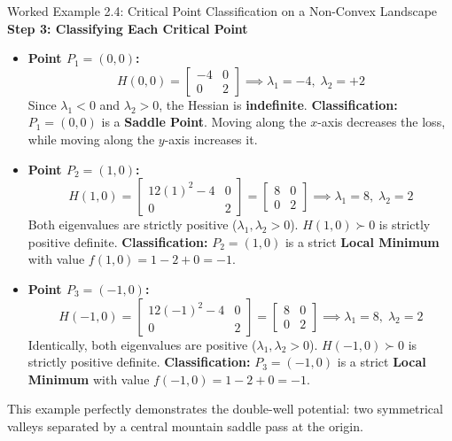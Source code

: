 \begin{examplebox}[breakable]{Worked Example 2.4: Critical Point Classification on a Non-Convex Landscape}
\textbf{Step 3: Classifying Each Critical Point}
\begin{itemize}
    \item \textbf{Point $P_1 = (0, 0)$:}
    \begin{equation*}
    H(0, 0) = \begin{bmatrix} -4 & 0 \\ 0 & 2 \end{bmatrix} \implies \lambda_1 = -4, \; \lambda_2 = +2
    \end{equation*}
    Since $\lambda_1 < 0$ and $\lambda_2 > 0$, the Hessian is \textbf{indefinite}.
    \textbf{Classification:} $P_1 = (0, 0)$ is a \textbf{Saddle Point}. Moving along the $x$-axis decreases the loss, while moving along the $y$-axis increases it.
    
    \item \textbf{Point $P_2 = (1, 0)$:}
    \begin{equation*}
    H(1, 0) = \begin{bmatrix} 12(1)^2 - 4 & 0 \\ 0 & 2 \end{bmatrix} = \begin{bmatrix} 8 & 0 \\ 0 & 2 \end{bmatrix} \implies \lambda_1 = 8, \; \lambda_2 = 2
    \end{equation*}
    Both eigenvalues are strictly positive ($\lambda_1, \lambda_2 > 0$). $H(1, 0) \succ 0$ is strictly positive definite.
    \textbf{Classification:} $P_2 = (1, 0)$ is a strict \textbf{Local Minimum} with value $f(1, 0) = 1 - 2 + 0 = -1$.

    \item \textbf{Point $P_3 = (-1, 0)$:}
    \begin{equation*}
    H(-1, 0) = \begin{bmatrix} 12(-1)^2 - 4 & 0 \\ 0 & 2 \end{bmatrix} = \begin{bmatrix} 8 & 0 \\ 0 & 2 \end{bmatrix} \implies \lambda_1 = 8, \; \lambda_2 = 2
    \end{equation*}
    Identically, both eigenvalues are positive ($\lambda_1, \lambda_2 > 0$). $H(-1, 0) \succ 0$ is strictly positive definite.
    \textbf{Classification:} $P_3 = (-1, 0)$ is a strict \textbf{Local Minimum} with value $f(-1, 0) = 1 - 2 + 0 = -1$.
\end{itemize}
This example perfectly demonstrates the double-well potential: two symmetrical valleys separated by a central mountain saddle pass at the origin.
\end{examplebox}

